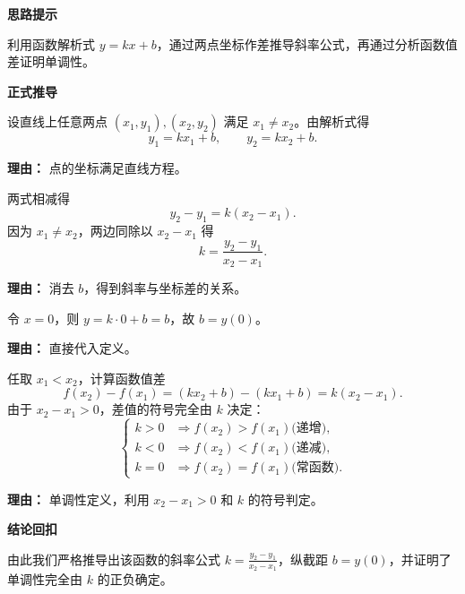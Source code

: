 \begin{proofbox}
	\textbf{\textcolor{CProof}{思路提示}}

	利用函数解析式 $y=kx+b$，通过两点坐标作差推导斜率公式，再通过分析函数值差证明单调性。

	\medskip
	\textbf{\textcolor{CProof}{正式推导}}
	\begin{description}[style=nextline, leftmargin=2.8em, labelsep=0.5em, itemsep=0.55em]
		\item[\textbf{步骤一（设点代入）：}] 设直线上任意两点 $(x_1,y_1),(x_2,y_2)$ 满足 $x_1\neq x_2$。由解析式得
			\[
				y_1 = kx_1 + b,
				\qquad
				y_2 = kx_2 + b.
			\]
			\par\textbf{理由：} 点的坐标满足直线方程。

		\item[\textbf{步骤二（作差求斜率）：}] 两式相减得
			\[
				y_2 - y_1 = k(x_2 - x_1).
			\]
			因为 $x_1\neq x_2$，两边同除以 $x_2-x_1$ 得
			\[
				k = \frac{y_2 - y_1}{x_2 - x_1}.
			\]
			\par\textbf{理由：} 消去 $b$，得到斜率与坐标差的关系。

		\item[\textbf{步骤三（求纵截距）：}] 令 $x=0$，则 $y = k\cdot 0 + b = b$，故 $b = y(0)$。
			\par\textbf{理由：} 直接代入定义。

		\item[\textbf{步骤四（证明单调性）：}] 任取 $x_1 < x_2$，计算函数值差
			\[
				f(x_2) - f(x_1) = (kx_2 + b) - (kx_1 + b) = k(x_2 - x_1).
			\]
			由于 $x_2 - x_1 > 0$，差值的符号完全由 $k$ 决定：
			\[
				\begin{cases}
					k > 0 & \Rightarrow f(x_2) > f(x_1) \text{(递增)},\\
					k < 0 & \Rightarrow f(x_2) < f(x_1) \text{(递减)},\\
					k = 0 & \Rightarrow f(x_2) = f(x_1) \text{(常函数)}.
			\end{cases}
			\]
			\par\textbf{理由：} 单调性定义，利用 $x_2-x_1>0$ 和 $k$ 的符号判定。

	\end{description}

	\medskip
	\textbf{\textcolor{CProof}{结论回扣}}

	由此我们严格推导出该函数的斜率公式 $k = \frac{y_2-y_1}{x_2-x_1}$，纵截距 $b = y(0)$，并证明了单调性完全由 $k$ 的正负确定。
\end{proofbox}
